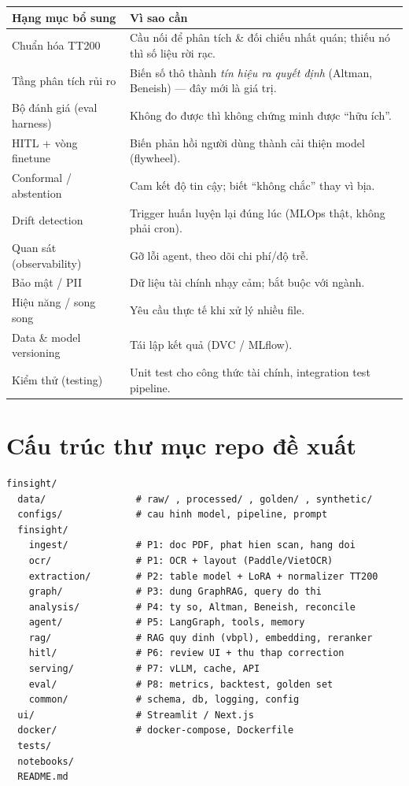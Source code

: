 \documentclass[11pt,a4paper]{article}
\begin{document}
\renewcommand{\arraystretch}{1.2}
\begin{longtable}{>{\raggedright\arraybackslash}p{4.6cm} >{\raggedright\arraybackslash}p{10.4cm}}
\toprule
\textbf{Hạng mục bổ sung} & \textbf{Vì sao cần} \\
\midrule
\endhead
Chuẩn hóa TT200 & Cầu nối để phân tích \& đối chiếu nhất quán; thiếu nó thì số liệu rời rạc. \\
Tầng phân tích rủi ro & Biến số thô thành \emph{tín hiệu ra quyết định} (Altman, Beneish) --- đây mới là giá trị. \\
Bộ đánh giá (eval harness) & Không đo được thì không chứng minh được ``hữu ích''. \\
HITL + vòng finetune & Biến phản hồi người dùng thành cải thiện model (flywheel). \\
Conformal / abstention & Cam kết độ tin cậy; biết ``không chắc'' thay vì bịa. \\
Drift detection & Trigger huấn luyện lại đúng lúc (MLOps thật, không phải cron). \\
Quan sát (observability) & Gỡ lỗi agent, theo dõi chi phí/độ trễ. \\
Bảo mật / PII & Dữ liệu tài chính nhạy cảm; bắt buộc với ngành. \\
Hiệu năng / song song & Yêu cầu thực tế khi xử lý nhiều file. \\
Data \& model versioning & Tái lập kết quả (DVC / MLflow). \\
Kiểm thử (testing) & Unit test cho công thức tài chính, integration test pipeline. \\
\bottomrule
\end{longtable}

\section{Cấu trúc thư mục repo đề xuất}
\begin{verbatim}
finsight/
  data/                # raw/ , processed/ , golden/ , synthetic/
  configs/             # cau hinh model, pipeline, prompt
  finsight/
    ingest/            # P1: doc PDF, phat hien scan, hang doi
    ocr/               # P1: OCR + layout (Paddle/VietOCR)
    extraction/        # P2: table model + LoRA + normalizer TT200
    graph/             # P3: dung GraphRAG, query do thi
    analysis/          # P4: ty so, Altman, Beneish, reconcile
    agent/             # P5: LangGraph, tools, memory
    rag/               # RAG quy dinh (vbpl), embedding, reranker
    hitl/              # P6: review UI + thu thap correction
    serving/           # P7: vLLM, cache, API
    eval/              # P8: metrics, backtest, golden set
    common/            # schema, db, logging, config
  ui/                  # Streamlit / Next.js
  docker/              # docker-compose, Dockerfile
  tests/
  notebooks/
  README.md
\end{verbatim}
\end{document}
